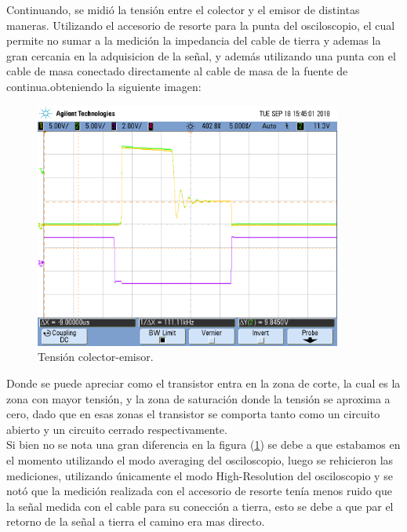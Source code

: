 Continuando, se midió la tensión entre el colector y el emisor de distintas maneras. Utilizando el accesorio de resorte para la punta del osciloscopio, el cual permite no sumar a la medición la impedancia del cable de tierra y ademas la gran cercania en la adquisicion de la señal,  y además utilizando una punta con el cable de masa conectado directamente al cable de masa de la fuente de continua.obteniendo la siguiente imagen:
\begin{figure}[H]
	\centering
	\includegraphics[width=0.9\textwidth]{Imagenes/vce_pe_both.png}
\caption{Tensión colector-emisor.}
	\label{fig:vce}
\end{figure}
Donde se puede apreciar como el transistor entra en la zona de corte, la cual es la zona con mayor tensión, y la zona de saturación donde la tensión se aproxima a cero, dado que en esas zonas el transistor se comporta tanto como un circuito abierto y un circuito cerrado respectivamente.\\Si bien no se nota una gran  diferencia  en la figura (\ref{fig:vce}) se debe a que estabamos en el momento utilizando el modo averaging del osciloscopio, luego se rehicieron las mediciones, utilizando únicamente el modo High-Resolution del osciloscopio y se notó que la medición realizada con el accesorio de resorte tenía menos ruido que la señal medida con el cable para su conección a tierra, esto se debe a que par el retorno de la señal a tierra el camino era mas directo. 



